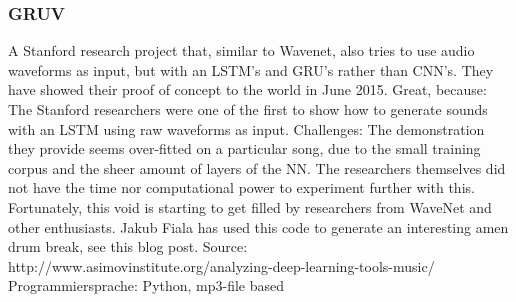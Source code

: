 {\subsubsection{GRUV}
A Stanford research project that, similar to Wavenet, also tries to use audio waveforms as input, but with an LSTM’s and GRU’s rather than CNN’s. They have showed their proof of concept to the world in June 2015.
Great, because: The Stanford researchers were one of the first to show how to generate sounds with an LSTM using raw waveforms as input.
Challenges: The demonstration they provide seems over-fitted on a particular song, due to the small training corpus and the sheer amount of layers of the NN. The researchers themselves did not have the time nor computational power to experiment further with this. Fortunately, this void is starting to get filled by researchers from WaveNet and other enthusiasts. Jakub Fiala has used this code to generate an interesting amen drum break, see this blog post.
Source: http://www.asimovinstitute.org/analyzing-deep-learning-tools-music/
Programmiersprache: Python, mp3-file based

} %